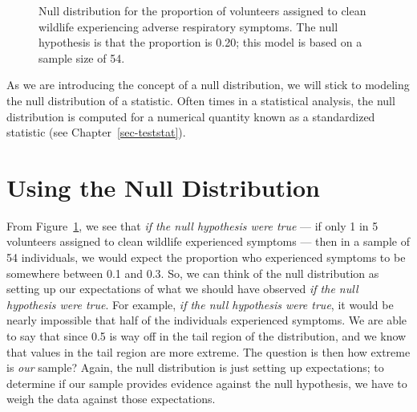 \documentclass[
  letterpaper,
  DIV=11,
  numbers=noendperiod]{scrreprt}
\theoremstyle{definition}
\theoremstyle{definition}
\theoremstyle{plain}
\theoremstyle{remark}
\begin{document}
\begin{figure}


\caption{\label{fig-nulldistns-deepwater-null}Null distribution for the
proportion of volunteers assigned to clean wildlife experiencing adverse
respiratory symptoms. The null hypothesis is that the proportion is
0.20; this model is based on a sample size of 54.}

\end{figure}%

As we are introducing the concept of a null distribution, we will stick
to modeling the null distribution of a statistic. Often times in a
statistical analysis, the null distribution is computed for a numerical
quantity known as a standardized statistic (see
Chapter~\ref{sec-teststat}).

\section{Using the Null Distribution}\label{using-the-null-distribution}

From Figure~\ref{fig-nulldistns-deepwater-null}, we see that \emph{if
the null hypothesis were true} --- if only 1 in 5 volunteers assigned to
clean wildlife experienced symptoms --- then in a sample of 54
individuals, we would expect the proportion who experienced symptoms to
be somewhere between 0.1 and 0.3. So, we can think of the null
distribution as setting up our expectations of what we should have
observed \emph{if the null hypothesis were true}. For example, \emph{if
the null hypothesis were true}, it would be nearly impossible that half
of the individuals experienced symptoms. We are able to say that since
0.5 is way off in the tail region of the distribution, and we know that
values in the tail region are more extreme. The question is then how
extreme is \emph{our} sample? Again, the null distribution is just
setting up expectations; to determine if our sample provides evidence
against the null hypothesis, we have to weigh the data against those
expectations.
\end{document}
